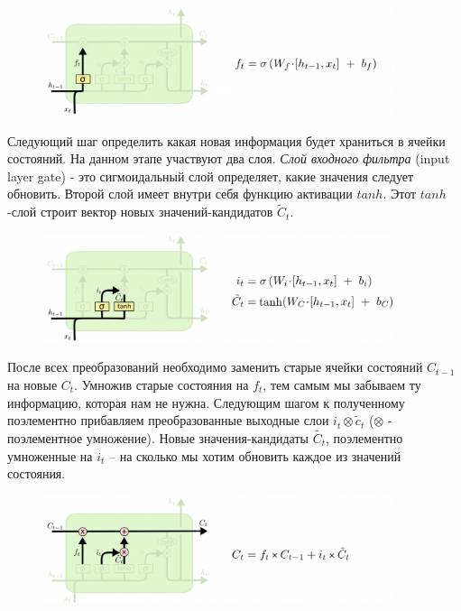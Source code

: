     \begin{figure}[ht!]
		\centering
		\captionsetup{justification=centering}
		\includegraphics[width=0.92\textwidth]{img/LSTM_step1.png}
	\end{figure}
	
	Следующий шаг определить какая новая информация будет храниться в ячейки состояний. На данном этапе участвуют два слоя. \textit{Слой входного фильтра} (input layer gate) - это сигмоидальный слой определяет, какие значения следует обновить. Второй слой имеет внутри себя функцию активации $tanh$. Этот $tanh$-слой строит вектор новых значений-кандидатов $\tilde{C}_t$.
    
    \begin{figure}[h]
		\centering
		\captionsetup{justification=centering}
		\includegraphics[width=0.92\textwidth]{img/LSTM_step2.png}
	\end{figure}
	
    После всех преобразований необходимо заменить старые ячейки состояний $C_{t-1}$ на новые $C_t$. Умножив старые состояния на $f_t$, тем самым мы забываем ту информацию, которая нам не нужна. Следующим шагом к полученному поэлементно прибавляем преобразованные выходные слои $i_t \otimes \tilde{c}_t$ ($\otimes$ - поэлементное умножение). Новые значения-кандидаты $\tilde{C_t}$, поэлементно умноженные на $i_t$ – на сколько мы хотим обновить каждое из значений состояния.

    \begin{figure}[h]
		\centering
		\captionsetup{justification=centering}
		\includegraphics[width=0.92\textwidth]{img/LSTM_step3.png}
	\end{figure}
	
